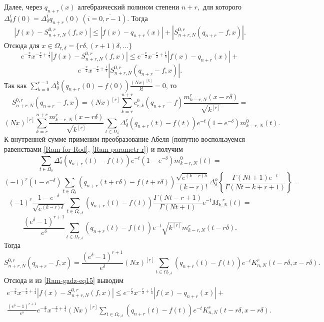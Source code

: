 Далее, через $q_{n+r}(x)$ алгебраический полином степени $n+r,$ для которого
$
\Delta^i_\delta f(0)=\Delta^i_\delta q_{n+r}(0)\ (i=\overline{0, r-1}).
$
Тогда
$$
\left|f(x)-S_{n+r,N}^{0,r}(f,x)\right|\leq\left|f(x)-q_{n+r}(x)\right|+\left|S_{n+r,N}^{0,r}(q_{n+r}-f,x)\right|.
$$
Отсюда для $x\in\Omega_{r,\delta}=\{r\delta, (r+1)\delta, \ldots\}$
$$
e^{-{\frac{x}{2}}}x^{-{\frac{r}{2}}+{\frac{1}{4}}}\left|f(x)-S_{n+r,N}^{0,r}(f,x)\right|\leq e^{-{\frac{x}{2}}}x^{-{\frac{r}{2}}+{\frac{1}{4}}}\left|f(x)-q_{n+r}(x)\right|+
$$
\begin{equation}\label{Ram-gadz-eq15}
e^{-{\frac{x}{2}}}x^{-{\frac{r}{2}}+{\frac{1}{4}}}\left|S_{n+r,N}^{0,r}(q_{n+r}-f,x)\right|.
\end{equation}
Так как $\sum\limits_{k=0}^{r-1}\Delta_\delta^k(q_{n+r}(0)-f(0))\frac{(Nx)^{[k]}}{k!}=0$, то
$$
S_{n+r,N}^{0,r}(q_{n+r}-f,x)=
(Nx)^{[r]}\sum_{k=r}^{n+r}c_{r,k}^0(q_{n+r}-f) \frac{m^{r}_{k-r,N}(x-r\delta)}{\sqrt{k^{[r]}}}=
$$
$$
(Nx)^{[r]}\sum_{k=r}^{n+r}\frac{m^{r}_{k-r,N}(x-r\delta)}{\sqrt{k^{[r]}}}
\sum_{t\in\Omega_{\delta}}\Delta_\delta^r(q_{n+r}(t)-f(t))e^{-t}(1-e^{-\delta})m_{k-r,N}^0(t).
$$
К внутренней сумме применим преобразование Абеля (попутно воспользуемся равенствами \eqref{Ram-for-Rod}, \eqref{Ram-parametr-r}) и получим
$$
\sum_{t\in\Omega_{\delta}}\Delta_\delta^r(q_{n+r}(t)-f(t))e^{-t}(1-e^{-\delta})m_{k-r,N}^0(t)=
$$
$$
(-1)^r(1-e^{-\delta})\sum_{t\in\Omega_{\delta}}(q_{n+r}(t+r\delta)-f(t+r\delta))\frac{\sqrt{e^{(k-r)\delta}}}{(k-r)!}
\Delta_\delta^k\left\{\frac{\Gamma(Nt+1)e^{-t}}{\Gamma(Nt-k+r+1)}\right\}=
$$
$$
(-1)^r\frac{1-e^{-\delta}}{\sqrt{e^{(k-r)\delta}}}\sum_{t\in\Omega_{r,\delta}}(q_{n+r}(t)-f(t))\frac{\Gamma(Nt-r+1)}{\Gamma(Nt+1)}e^{-t}M_{k,N}^{-r}(t)=
$$
$$
\frac{(e^{\delta}-1)^{r+1}}{e^\delta}\sum_{t\in\Omega_{r,\delta}}(q_{n+r}(t)-f(t))e^{-t}\sqrt{k^{[r]}}m_{k-r,N}^{r}(t-r\delta).
$$
Тогда
$$
S_{n+r,N}^{0,r}(q_{n+r}-f,x)=\frac{(e^{\delta}-1)^{r+1}}{e^\delta}(Nx)^{[r]}\sum_{t\in\Omega_{r,\delta}}(q_{n+r}(t)-f(t))e^{-t}K_{n,N}^r(t-r\delta,x-r\delta).
$$
Отсюда и из \eqref{Ram-gadz-eq15} выводим
\begin{multline}\label{Ram-gadz-eq16}
e^{-{\frac{x}{2}}}x^{-{\frac{r}{2}}+{\frac{1}{4}}}\left|f(x)-S_{n+r,N}^{0,r}(f,x)\right|\leq e^{-{\frac{x}{2}}}x^{-{\frac{r}{2}}+{\frac{1}{4}}}\left|f(x)-q_{n+r}(x)\right|+\\
\frac{(e^{\delta}-1)^{r+1}}{e^\delta}e^{-{\frac{x}{2}}}x^{-{\frac{r}{2}}+{\frac{1}{4}}}(Nx)^{[r]}\sum_{t\in\Omega_{r,\delta}}(q_{n+r}(t)-f(t))e^{-t}K_{n,N}^r(t-r\delta,x-r\delta).
\end{multline}

